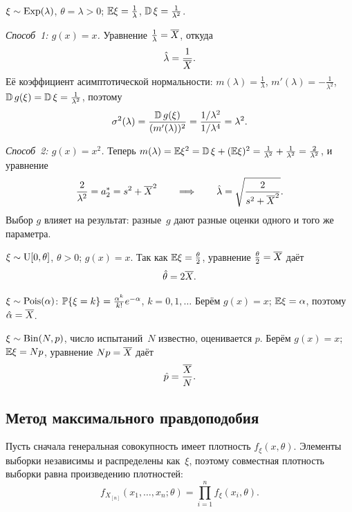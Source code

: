 \begin{example}
  \label{lec07:ex:mm-exp}
  $\xi \sim \Exp(\lambda)$, $\theta = \lambda > 0$; $\E\xi = \frac1\lambda$,
  $\D\xi = \frac{1}{\lambda^2}$.

  \emph{Способ~1: $g(x) = x$.} Уравнение $\frac1\lambda = \Xbar$, откуда
  \[
    \hat\lambda = \frac{1}{\Xbar}.
  \]
  Её коэффициент асимптотической нормальности: $m(\lambda) = \frac1\lambda$,
  $m'(\lambda) = -\frac{1}{\lambda^2}$, $\D g(\xi) = \D\xi = \frac{1}{\lambda^2}$, поэтому
  \[
    \sigma^2(\lambda) = \frac{\D g(\xi)}{(m'(\lambda))^2} = \frac{1/\lambda^2}{1/\lambda^4} = \lambda^2.
  \]

  \emph{Способ~2: $g(x) = x^2$.} Теперь $m(\lambda) = \E\xi^2 = \D\xi + (\E\xi)^2
  = \frac{1}{\lambda^2} + \frac{1}{\lambda^2} = \frac{2}{\lambda^2}$, и уравнение
  \[
    \frac{2}{\lambda^2} = a_2^* = s^2 + \Xbar^2
    \qquad\Longrightarrow\qquad
    \hat\lambda = \sqrt{\frac{2}{s^2 + \Xbar^2}}.
  \]
  Выбор $g$ влияет на результат: разные~$g$ дают разные оценки одного и того же параметра.
\end{example}

\begin{example}
  \label{lec07:ex:mm-unif}
  $\xi \sim \Unif[0, \theta]$, $\theta > 0$; $g(x) = x$. Так как $\E\xi = \frac\theta2$,
  уравнение $\frac\theta2 = \Xbar$ даёт
  \[
    \hat\theta = 2\Xbar.
  \]
\end{example}

\begin{example}
  $\xi \sim \Pois(\alpha)$: $\P\{\xi = k\} = \frac{\alpha^k}{k!} e^{-\alpha}$, $k = 0, 1, \ldots$
  Берём $g(x) = x$; $\E\xi = \alpha$, поэтому $\hat\alpha = \Xbar$.
\end{example}

\begin{example}
  $\xi \sim \Bin(N, p)$, число испытаний~$N$ известно, оценивается $p$.
  Берём $g(x) = x$; $\E\xi = Np$, уравнение $Np = \Xbar$ даёт
  \[
    \hat p = \frac{\Xbar}{N}.
  \]
\end{example}

\subsection{Метод максимального правдоподобия}
\label{lec07:mle}

Пусть сначала генеральная совокупность имеет плотность $f_\xi(x, \theta)$. Элементы выборки
независимы и распределены как~$\xi$, поэтому совместная плотность выборки равна
произведению плотностей:
\[
  f_{X_{[n]}}(x_1, \ldots, x_n; \theta) = \prod_{i=1}^n f_\xi(x_i, \theta).
\]

